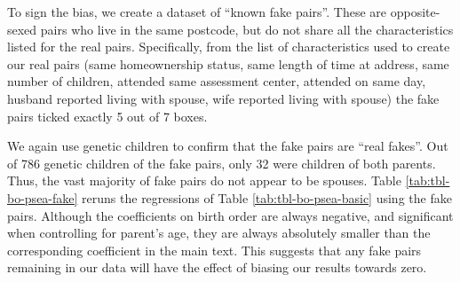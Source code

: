\documentclass[
  12pt,
]{article}
\theoremstyle{definition}
\theoremstyle{definition}
\theoremstyle{definition}
\theoremstyle{definition}
\theoremstyle{remark}
\begin{document}
To sign the bias, we create a dataset of ``known fake pairs''. These are
opposite-sexed pairs who live in the same postcode, but do not share all
the characteristics listed for the real pairs. Specifically, from the
list of characteristics used to create our real pairs (same
homeownership status, same length of time at address, same number of
children, attended same assessment center, attended on same day, husband
reported living with spouse, wife reported living with spouse) the fake
pairs ticked exactly 5 out of 7 boxes.

We again use genetic children to confirm that the fake pairs are ``real
fakes''. Out of 786 genetic children of the fake pairs, only
32 were children of both parents. Thus, the vast majority of
fake pairs do not appear to be spouses. Table
\ref{tab:tbl-bo-psea-fake} reruns the regressions of Table
\ref{tab:tbl-bo-psea-basic} using the fake pairs. Although the
coefficients on birth order are always negative, and significant when
controlling for parent's age, they are always absolutely smaller than
the corresponding coefficient in the main text. This suggests that any
fake pairs remaining in our data will have the effect of biasing our
results towards zero.

 
  \providecommand{\huxb}[2]{\arrayrulecolor[RGB]{#1}\global\arrayrulewidth=#2pt}
  \providecommand{\huxvb}[2]{\color[RGB]{#1}\vrule width #2pt}
  \providecommand{\huxtpad}[1]{\rule{0pt}{#1}}
  \providecommand{\huxbpad}[1]{\rule[-#1]{0pt}{#1}}
\end{document}

